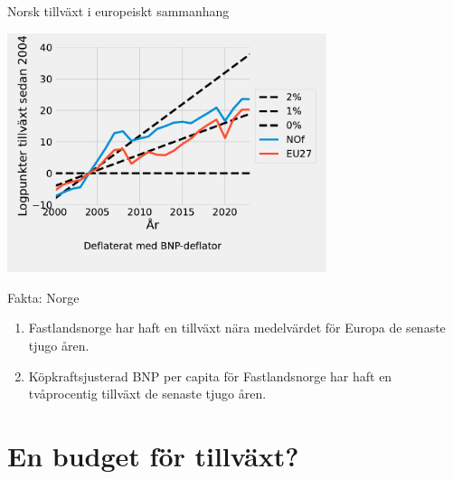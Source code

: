 \documentclass{beamer}
\begin{document}
\begin{frame}{Norsk tillväxt i europeiskt sammanhang}

    \label{europe_gdp}
    \begin{center}
        \includegraphics[width=0.7\textwidth]{figures/GDP_growth0_Europe_Norway.pdf}
    \end{center}

    \hyperlink{europe_cpi}{}
\end{frame}

\begin{frame}{Fakta: Norge}

    \begin{enumerate}
        \item Fastlandsnorge har haft en tillväxt nära medelvärdet för Europa de senaste tjugo åren.
        \item Köpkraftsjusterad BNP per capita för Fastlandsnorge har haft en tvåprocentig tillväxt de senaste tjugo åren.
    \end{enumerate}

\end{frame}

\section{En budget för tillväxt?}
\end{document}
